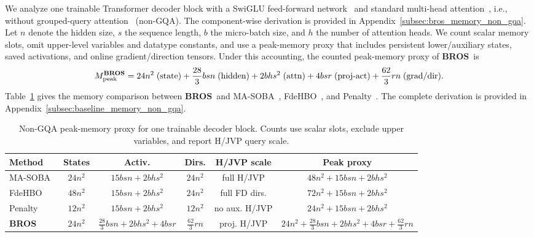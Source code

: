 \documentclass{pkumelon}
\theoremstyle{plain}
\newcommand{\oursname}{\textnormal{\textbf{BROS}}}
\newcommand{\ours}{\oursname\ }
\newcommand{\ourslast}{\oursname}
\begin{document}
We analyze one trainable Transformer decoder block with a SwiGLU feed-forward network~\cite{shazeer2020glu} and standard multi-head attention~\cite{vaswani2017attention}, i.e., without grouped-query attention~\cite{ainslie2023gqa} (non-GQA). The component-wise derivation is provided in Appendix~\ref{subsec:bros_memory_non_gqa}. Let $n$ denote the hidden size, $s$ the sequence length, $b$ the micro-batch size, and $h$ the number of attention heads. We count scalar memory slots, omit upper-level variables and datatype constants, and use a peak-memory proxy that includes persistent lower/auxiliary states, saved activations, and online gradient/direction tensors. Under this accounting, the counted peak-memory proxy of \ours is
\begin{equation*}
M_{\rm peak}^{\text{\ourslast}}=24n^2\;(\text{state})+\frac{28}{3}bsn\;(\text{hidden})+2bhs^2\;(\text{attn})+4bsr\;(\text{proj-act})+\frac{62}{3}rn\;(\text{grad/dir}).
\end{equation*}
Table~\ref{tab:memory_constants_bros} gives the memory comparison between \ours and MA-SOBA~\citep{chen2024optimal}, FdeHBO~\citep{yang2023achieving}, and Penalty~\citep{mehra2021penalty}. The complete derivation is provided in Appendix~\ref{subsec:baseline_memory_non_gqa}.

\begin{table}[t!]
\centering
\caption{Non-GQA peak-memory proxy for one trainable decoder block. Counts use scalar slots, exclude upper variables, and report H/JVP query scale.}
\label{tab:memory_constants_bros}
\small
\setlength{\tabcolsep}{6.0pt}
\renewcommand{\arraystretch}{1.12}
\begin{tabular}{lccccc}
\toprule
Method & States & Activ. & Dirs. & H/JVP scale & Peak proxy \\
\midrule
MA-SOBA~\citep{chen2024optimal}
& $24n^2$
& $15bsn+2bhs^2$
& $24n^2$
& full H/JVP
& $48n^2+15bsn+2bhs^2$ \\
FdeHBO~\citep{yang2023achieving}
& $48n^2$
& $15bsn+2bhs^2$
& $24n^2$
& full FD dirs.
& $72n^2+15bsn+2bhs^2$ \\
Penalty~\citep{mehra2021penalty}
& $12n^2$
& $15bsn+2bhs^2$
& $12n^2$
& no aux. H/JVP
& $24n^2+15bsn+2bhs^2$ \\
\rowcolor{boxbg}
\ourslast
& $24n^2$
& $\frac{28}{3}bsn+2bhs^2+4bsr$
& $\frac{62}{3}rn$
& proj. H/JVP
& $24n^2+\frac{28}{3}bsn+2bhs^2+4bsr+\frac{62}{3}rn$ \\
\bottomrule
\end{tabular}
\end{table}
\end{document}
